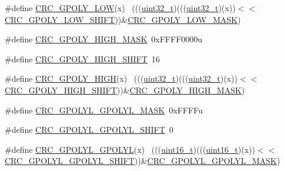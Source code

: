 \begin{DoxyCompactItemize}
\item 
\#define \hyperlink{group___c_r_c___register___masks_ga8ca8f0515fe1c754a85c9675a72724a2}{C\+R\+C\+\_\+\+G\+P\+O\+L\+Y\+\_\+\+L\+OW}(x)                                              ~(((\hyperlink{_p_e___types_8h_a33594304e786b158f3fb30289278f5af}{uint32\+\_\+t})(((\hyperlink{_p_e___types_8h_a33594304e786b158f3fb30289278f5af}{uint32\+\_\+t})(x))$<$$<$\hyperlink{group___c_r_c___register___masks_ga3830f95399bd5190027aaf00f307d10b}{C\+R\+C\+\_\+\+G\+P\+O\+L\+Y\+\_\+\+L\+O\+W\+\_\+\+S\+H\+I\+FT}))\&\hyperlink{group___c_r_c___register___masks_ga861d4f6f458051a63a7b01e6e5d8794b}{C\+R\+C\+\_\+\+G\+P\+O\+L\+Y\+\_\+\+L\+O\+W\+\_\+\+M\+A\+SK})
\item 
\#define \hyperlink{group___c_r_c___register___masks_ga96c07e55f3d3c43d7b3e7637bc854ed6}{C\+R\+C\+\_\+\+G\+P\+O\+L\+Y\+\_\+\+H\+I\+G\+H\+\_\+\+M\+A\+SK}~0x\+F\+F\+F\+F0000u
\item 
\#define \hyperlink{group___c_r_c___register___masks_ga991debc471e54dcf5297d6a42c5778e6}{C\+R\+C\+\_\+\+G\+P\+O\+L\+Y\+\_\+\+H\+I\+G\+H\+\_\+\+S\+H\+I\+FT}~16
\item 
\#define \hyperlink{group___c_r_c___register___masks_ga90a11ee1325340cc0d7e18d791814a36}{C\+R\+C\+\_\+\+G\+P\+O\+L\+Y\+\_\+\+H\+I\+GH}(x)                                            ~(((\hyperlink{_p_e___types_8h_a33594304e786b158f3fb30289278f5af}{uint32\+\_\+t})(((\hyperlink{_p_e___types_8h_a33594304e786b158f3fb30289278f5af}{uint32\+\_\+t})(x))$<$$<$\hyperlink{group___c_r_c___register___masks_ga991debc471e54dcf5297d6a42c5778e6}{C\+R\+C\+\_\+\+G\+P\+O\+L\+Y\+\_\+\+H\+I\+G\+H\+\_\+\+S\+H\+I\+FT}))\&\hyperlink{group___c_r_c___register___masks_ga96c07e55f3d3c43d7b3e7637bc854ed6}{C\+R\+C\+\_\+\+G\+P\+O\+L\+Y\+\_\+\+H\+I\+G\+H\+\_\+\+M\+A\+SK})
\item 
\#define \hyperlink{group___c_r_c___register___masks_ga7512a0f84b048e7a54207f9a7e619494}{C\+R\+C\+\_\+\+G\+P\+O\+L\+Y\+L\+\_\+\+G\+P\+O\+L\+Y\+L\+\_\+\+M\+A\+SK}~0x\+F\+F\+F\+Fu
\item 
\#define \hyperlink{group___c_r_c___register___masks_gaf4e5ed1d1478c1a6c8c5681e2b1d24aa}{C\+R\+C\+\_\+\+G\+P\+O\+L\+Y\+L\+\_\+\+G\+P\+O\+L\+Y\+L\+\_\+\+S\+H\+I\+FT}~0
\item 
\#define \hyperlink{group___c_r_c___register___masks_ga9c1eb3a492719fa1461f3bc3d2593462}{C\+R\+C\+\_\+\+G\+P\+O\+L\+Y\+L\+\_\+\+G\+P\+O\+L\+YL}(x)                                      ~(((\hyperlink{_p_e___types_8h_a1f1825b69244eb3ad2c7165ddc99c956}{uint16\+\_\+t})(((\hyperlink{_p_e___types_8h_a1f1825b69244eb3ad2c7165ddc99c956}{uint16\+\_\+t})(x))$<$$<$\hyperlink{group___c_r_c___register___masks_gaf4e5ed1d1478c1a6c8c5681e2b1d24aa}{C\+R\+C\+\_\+\+G\+P\+O\+L\+Y\+L\+\_\+\+G\+P\+O\+L\+Y\+L\+\_\+\+S\+H\+I\+FT}))\&\hyperlink{group___c_r_c___register___masks_ga7512a0f84b048e7a54207f9a7e619494}{C\+R\+C\+\_\+\+G\+P\+O\+L\+Y\+L\+\_\+\+G\+P\+O\+L\+Y\+L\+\_\+\+M\+A\+SK})
$$
\end{DoxyCompactItemize}
